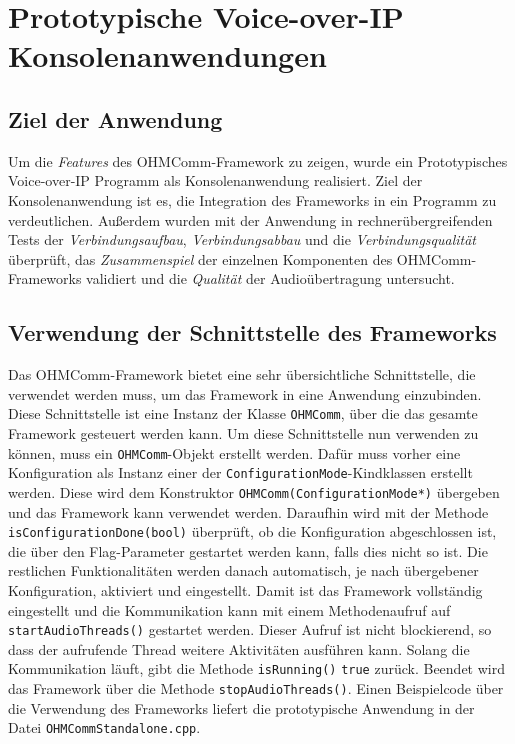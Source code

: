 \chapter{Prototypische Voice-over-IP Konsolenanwendungen}
\label{prototypProgram}
\section{Ziel der Anwendung}

Um die \textit{Features} des OHMComm-Framework zu zeigen, wurde ein Prototypisches Voice-over-IP Programm als Konsolenanwendung realisiert. Ziel der Konsolenanwendung ist es, die Integration des Frameworks in ein Programm zu verdeutlichen. Außerdem wurden mit der Anwendung in rechnerübergreifenden Tests der \textit{Verbindungsaufbau}, \textit{Verbindungsabbau} und die \textit{Verbindungsqualität} überprüft, das \textit{Zusammenspiel} der einzelnen Komponenten des OHMComm-Frameworks validiert und die \textit{Qualität} der Audioübertragung untersucht. 

\section{Verwendung der Schnittstelle des Frameworks}
Das OHMComm-Framework bietet eine sehr übersichtliche Schnittstelle, die verwendet werden muss, um das Framework in eine Anwendung einzubinden. Diese Schnittstelle ist eine Instanz der Klasse \texttt{OHMComm}, über die das gesamte Framework gesteuert werden kann. Um diese Schnittstelle nun verwenden zu können, muss ein \texttt{OHMComm}-Objekt erstellt werden. Dafür muss vorher eine Konfiguration als Instanz einer der \texttt{ConfigurationMode}-Kindklassen erstellt werden. Diese wird dem Konstruktor \texttt{OHMComm(ConfigurationMode*)} übergeben und das Framework kann verwendet werden. Daraufhin wird mit der Methode \texttt{isConfigurationDone\allowbreak{}(bool)} überprüft, ob die Konfiguration abgeschlossen ist, die über den Flag-Parameter gestartet werden kann, falls dies nicht so ist. Die restlichen Funktionalitäten werden danach automatisch, je nach übergebener Konfiguration, aktiviert und eingestellt. Damit ist das Framework vollständig eingestellt und die Kommunikation kann mit einem Methodenaufruf auf \texttt{startAudioThreads()} gestartet werden. Dieser Aufruf ist nicht blockierend, so dass der aufrufende Thread weitere Aktivitäten ausführen kann. Solang die Kommunikation läuft, gibt die Methode \texttt{isRunning()} \texttt{true} zurück. Beendet wird das Framework über die Methode \texttt{stopAudioThreads()}. Einen Beispielcode über die Verwendung des Frameworks liefert die prototypische Anwendung in der Datei \texttt{OHMCommStandalone.cpp}.
